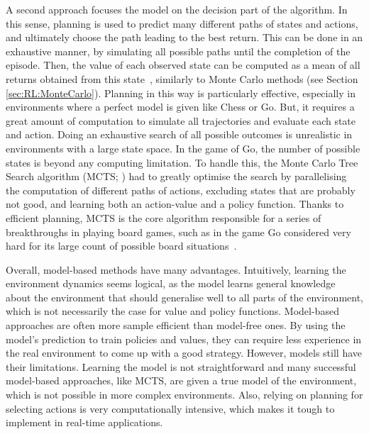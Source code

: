 A second approach focuses the model on the decision part of the algorithm. In this sense, planning is used to predict many different paths of states and actions, and ultimately choose the path leading to the best return. This can be done in an exhaustive manner, by simulating all possible paths until the completion of the episode. Then, the value of each observed state can be computed as a mean of all returns obtained from this state~\citep{Tesauro1996_MonteCarloSearch}, similarly to Monte Carlo methods (see Section \ref{sec:RL:MonteCarlo}). Planning in this way is particularly effective, especially in environments where a perfect model is given like Chess or Go. But, it requires a great amount of computation to simulate all trajectories and evaluate each state and action. Doing an exhaustive search of all possible outcomes is unrealistic in environments with a large state space. In the game of Go, the number of possible states is beyond any computing limitation. To handle this, the Monte Carlo Tree Search algorithm (MCTS; \cite{Coulom2006_MCTS}) had to greatly optimise the search by parallelising the computation of different paths of actions, excluding states that are probably not good, and learning both an action-value and a policy function. Thanks to efficient planning, MCTS is the core algorithm responsible for a series of breakthroughs in playing board games, such as in the game Go considered very hard for its large count of possible board situations~\citep{Coulom2006_MCTS,Finnsson2008_GamePlaying,Silver2016_AlphaGo,Schrittwieser2019_Muzero}.

Overall, model-based methods have many advantages. Intuitively, learning the environment dynamics seems logical, as the model learns general knowledge about the environment that should generalise well to all parts of the environment, which is not necessarily the case for value and policy functions. Model-based approaches are often more sample efficient than model-free ones. By using the model's prediction to train policies and values, they can require less experience in the real environment to come up with a good strategy. However, models still have their limitations. Learning the model is not straightforward and many successful model-based approaches, like MCTS, are given a true model of the environment, which is not possible in more complex environments. Also, relying on planning for selecting actions is very computationally intensive, which makes it tough to implement in real-time applications. 








